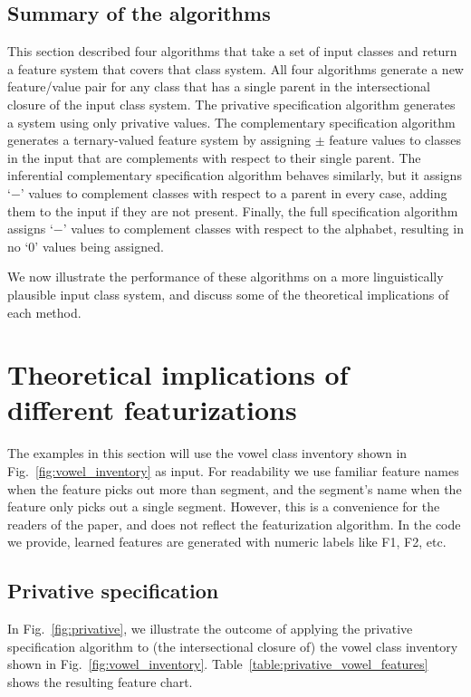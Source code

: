 \documentclass[12pt, oneside]{article}   	%
\begin{document}
\subsection{Summary of the algorithms}

This section described four algorithms that take a set of input classes and return a feature system that covers that class system. All four algorithms generate a new feature/value pair for any class that has a single parent in the intersectional closure of the input class system. The privative specification algorithm generates a system using only privative values. The complementary specification algorithm generates a ternary-valued feature system by assigning $\pm$ feature values to classes in the input that are complements with respect to their single parent. The inferential complementary specification algorithm behaves similarly, but it assigns `$-$' values to complement classes with respect to a parent in every case, adding them to the input if they are not present. Finally, the full specification algorithm assigns `$-$' values to complement classes with respect to the alphabet, resulting in no `0' values being assigned.

We now illustrate the performance of these algorithms on a more linguistically plausible input class system, and discuss some of the theoretical implications of each method.

\FloatBarrier
\section{Theoretical implications of different featurizations}
\label{sec:theoretical_implications}

The examples in this section will use the vowel class inventory shown in Fig.~\ref{fig:vowel_inventory} as input. For readability we use familiar feature names when the feature picks out more than segment, and the segment's name when the feature only picks out a single segment. However, this is a convenience for the readers of the paper, and does not reflect the featurization algorithm. In the code we provide, learned features are generated with numeric labels like F1, F2, etc.

\subsection{Privative specification}

In Fig.~\ref{fig:privative}, we illustrate the outcome of applying the privative specification algorithm to (the intersectional closure of) the vowel class inventory shown in Fig.~\ref{fig:vowel_inventory}. Table~\ref{table:privative_vowel_features} shows the resulting feature chart.
\end{document}
